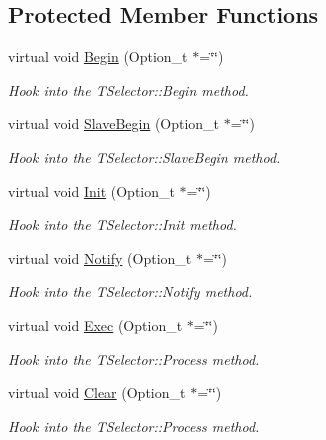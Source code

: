 \subsection*{Protected Member Functions}
\begin{DoxyCompactItemize}
\item 
virtual void \hyperlink{class_h_a_l_1_1_algorithm_a6273512af97092a7e50955cb69776d82}{Begin} (Option\+\_\+t $\ast$=\char`\"{}\char`\"{})
\begin{DoxyCompactList}\small\item\em Hook into the T\+Selector\+::\+Begin method. \end{DoxyCompactList}\item 
virtual void \hyperlink{class_h_a_l_1_1_algorithm_a468feb5807252729c62cce7db7d60b1d}{Slave\+Begin} (Option\+\_\+t $\ast$=\char`\"{}\char`\"{})
\begin{DoxyCompactList}\small\item\em Hook into the T\+Selector\+::\+Slave\+Begin method. \end{DoxyCompactList}\item 
virtual void \hyperlink{class_h_a_l_1_1_algorithm_abe2da2ce6a2d3ccfb492d8afd1d07331}{Init} (Option\+\_\+t $\ast$=\char`\"{}\char`\"{})
\begin{DoxyCompactList}\small\item\em Hook into the T\+Selector\+::\+Init method. \end{DoxyCompactList}\item 
virtual void \hyperlink{class_h_a_l_1_1_algorithm_acbbfee57e6c71ab04047dca6636f2c4f}{Notify} (Option\+\_\+t $\ast$=\char`\"{}\char`\"{})
\begin{DoxyCompactList}\small\item\em Hook into the T\+Selector\+::\+Notify method. \end{DoxyCompactList}\item 
virtual void \hyperlink{class_h_a_l_1_1_algorithm_a438c5c54698aa014b660474d08703bc2}{Exec} (Option\+\_\+t $\ast$=\char`\"{}\char`\"{})
\begin{DoxyCompactList}\small\item\em Hook into the T\+Selector\+::\+Process method. \end{DoxyCompactList}\item 
virtual void \hyperlink{class_h_a_l_1_1_algorithm_a2a26a5549e92efaa968763ac51e6758a}{Clear} (Option\+\_\+t $\ast$=\char`\"{}\char`\"{})
\begin{DoxyCompactList}\small\item\em Hook into the T\+Selector\+::\+Process method. \end{DoxyCompactList}\item 

\end{DoxyCompactItemize}
